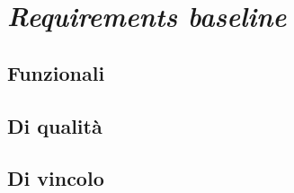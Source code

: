 \section{\textit{Requirements baseline}}

\subsection{Funzionali}

\subsection{Di qualità}

\subsection{Di vincolo}
